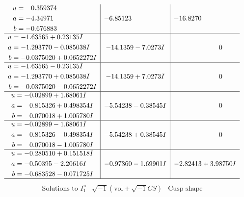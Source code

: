 \documentclass[1p]{elsarticle_modified}
\theoremstyle{definition}
\newcommand{\I}{\sqrt{-1}}
\begin{document}
$$\begin{array}{c|c|c}
\begin{aligned}
u &= \phantom{-}0.359374\phantom{ +0.000000I} \\
a &= -4.34971\phantom{ +0.000000I} \\
b &= -0.676883\phantom{ +0.000000I}\end{aligned}
 & -6.85123\phantom{ +0.000000I} & -16.8270\phantom{ +0.000000I} \\ \hline\begin{aligned}
u &= -1.63565 + 0.23135 I \\
a &= -1.293770 - 0.085038 I \\
b &= -0.0375020 + 0.0652272 I\end{aligned}
 & -14.1359 - 7.0273 I & \phantom{-0.000000 } 0 \\ \hline\begin{aligned}
u &= -1.63565 - 0.23135 I \\
a &= -1.293770 + 0.085038 I \\
b &= -0.0375020 - 0.0652272 I\end{aligned}
 & -14.1359 + 7.0273 I & \phantom{-0.000000 } 0 \\ \hline\begin{aligned}
u &= -0.02899 + 1.68061 I \\
a &= \phantom{-}0.815326 + 0.498354 I \\
b &= \phantom{-}0.070018 + 1.005780 I\end{aligned}
 & -5.54238 - 0.38545 I & \phantom{-0.000000 } 0 \\ \hline\begin{aligned}
u &= -0.02899 - 1.68061 I \\
a &= \phantom{-}0.815326 - 0.498354 I \\
b &= \phantom{-}0.070018 - 1.005780 I\end{aligned}
 & -5.54238 + 0.38545 I & \phantom{-0.000000 } 0 \\ \hline\begin{aligned}
u &= -0.280510 + 0.151518 I \\
a &= -0.50395 - 2.20616 I \\
b &= -0.683528 - 0.071725 I\end{aligned}
 & -0.97360 - 1.69901 I & -2.82413 + 3.98750 I\\
 \hline 
 \end{array}$$\newpage$$\begin{array}{c|c|c}  
\text{Solutions to }I^u_{1}& \I (\text{vol} + \sqrt{-1}CS) & \text{Cusp shape}\\
 \hline 
\begin{aligned}

\end{aligned}
\end{array}$$
\end{document}

